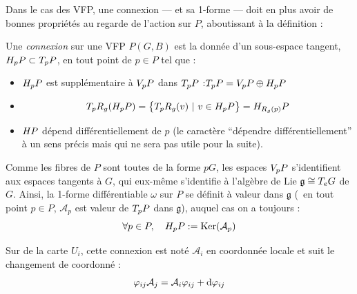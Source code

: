 Dans le cas des VFP, une connexion --- et sa 1-forme --- doit en plus avoir de bonnes propriétés au regarde de l'action sur $P$, aboutissant à la définition :
\begin{definition} \label{def:connexion2VFP}
	Une \emph{connexion} sur une VFP $P(G,B)$ est la donnée d'un sous-espace tangent, $\hg[p]{P}\subset \tg[p]{P}$, en tout point de $p\in P$ tel que :
	\begin{itemize}
		
		\item $\hg[p]{P}$ est supplémentaire à $\vg[p]{P}$ dans $\tg[p]{P}$ :\qquad $\tg[p]{P} = \vg[p]{P} \oplus \hg[p]{P}$
		
		\item \begin{equation}
			\tg[p]{R_g} (\hg[p]{P}) = \big\{\tg[p]{R_g}(v)\ |\ v \in \hg[p]{P} \big\} = \hg[R_g(p)]{P}
		\end{equation}
		
		\item $\hg{P}$ dépend différentiellement de $p$ (le caractère ``dépendre différentiellement'' à un sens précis mais qui ne sera pas utile pour la suite).
		
	\end{itemize}
	
	Comme les fibres de $P$ sont toutes de la forme $pG$, les espaces $\vg[p]{P}$ s'identifient aux espaces tangents à $G$, qui eux-même s'identifie à l'algèbre de Lie $\mathfrak{g}\cong \tg[e]{G}$ de $G$. Ainsi, la 1-forme différentiable $\omega$ sur $P$ se définit à valeur dans $\mathfrak{g}$ (\ie~en tout point $p\in P$, $\mathcal{A}_p$ est valeur de $\tg[p]{P}$ dans $\mathfrak{g}$), auquel cas on a toujours :
	\[\forall p\in P,\quad \hg[p]{P} \defeq \Ker(\mathcal{A}_p)\]
	
	Sur de la carte $U_{i}$, cette connexion est noté $\mathcal{A}_{i}$ en coordonnée locale et suit le changement de coordonné :
	\begin{equation}
		\varphi_{ij}\conn_j = \conn_i \varphi_{ij} + \d \varphi_{ij}
	\end{equation}
\end{definition}



